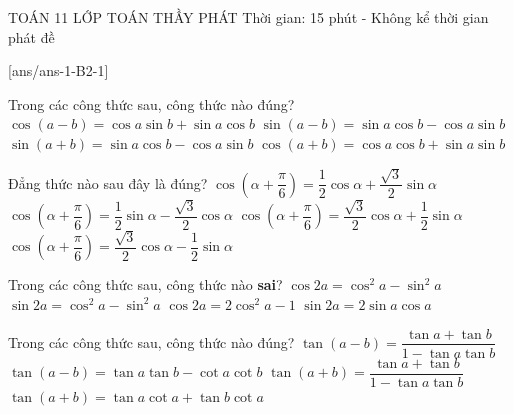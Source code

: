 \begin{name}
	{\tenchude}
	{TOÁN 11}
	{LỚP TOÁN THẦY PHÁT}
	{Thời gian: 15 phút - Không kể thời gian phát đề}
\end{name}
[ans/ans-1-B2-1]
\begin{ex}%
Trong các công thức sau, công thức nào đúng?
\choice
{$\cos (a-b)=\cos a\sin b+\sin a\cos b$}
{\True $\sin (a-b) = \sin a\cos b - \cos a\sin b$}
{$\sin (a+b) = \sin a\cos b - \cos a\sin b$}
{$\cos (a+b)=\cos a\cos b+\sin a\sin b$}
\end{ex}

\begin{ex}%
Đẳng thức nào sau đây là đúng?
\choice
{$\cos \left(\alpha +\dfrac{\pi }{6}\right)=\dfrac{1}{2}\cos \alpha +\dfrac{\sqrt{3}}{2}\sin \alpha $}
{$\cos \left(\alpha +\dfrac{\pi }{6}\right)=\dfrac{1}{2}\sin \alpha -\dfrac{\sqrt{3}}{2}\cos \alpha $}
{$\cos \left(\alpha +\dfrac{\pi }{6}\right)=\dfrac{\sqrt{3}}{2}\cos \alpha +\dfrac{1}{2}\sin \alpha $}
{\True $\cos \left(\alpha +\dfrac{\pi }{6}\right)=\dfrac{\sqrt{3}}{2}\cos \alpha -\dfrac{1}{2}\sin \alpha $}
\end{ex}

\begin{ex}%
Trong các công thức sau, công thức nào \textbf{sai}?
\choice
{$\cos 2a={\cos ^2}a-{\sin ^2}a$}
{\True $\sin 2a={\cos ^2}a-{\sin ^2}a$}
{$\cos 2a = 2{\cos ^2}a-1$}
{$\sin 2a=2\sin a\cos a$}
\end{ex}

\begin{ex}%
Trong các công thức sau, công thức nào đúng?
\choice
{$\tan (a-b) = \dfrac{\tan a + \tan b}{1 - \tan a\tan b}$}
{$\tan (a-b)=\tan a\tan b-\cot a\cot b$}
{\True $\tan (a+b) = \dfrac{\tan a + \tan b}{1 - \tan a\tan b}$}
{$\tan (a+b)=\tan a\cot a+\tan b\cot a$}
\end{ex}

